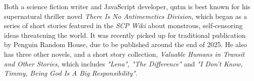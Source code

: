 Both a science fiction writer and JavaScript developer, qntm is best known for his supernatural thriller novel \emph{There Is No Antimemetics Division}, which began as a series of short stories featured in the \emph{SCP Wiki} about monstrous, self-censoring ideas threatening the world. It was recently picked up for traditional publication by Penguin Random House, due to be published around the end of 2025. He also has three other novels, and a short story collection, \emph{Valuable Humans in Transit and Other Stories}, which includes \emph{"Lena", "The Difference"} and \emph{"I Don't Know, Timmy, Being God Is A Big Responsibility"}.